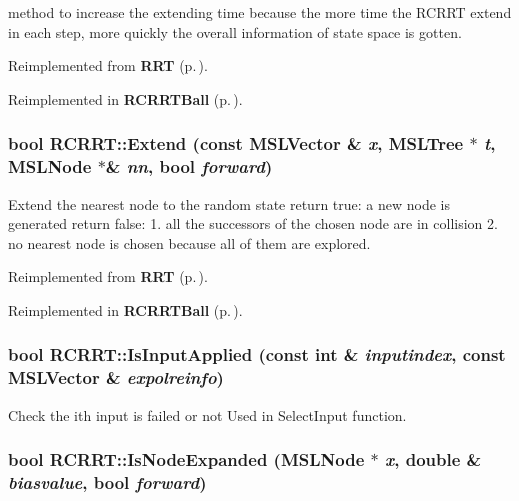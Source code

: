 method to increase the extending time because the more time the RCRRT extend in each step, more quickly the overall information of state space is gotten.



Reimplemented from {\bf RRT} {\rm (p.\,\pageref{classRRT_b3})}.

Reimplemented in {\bf RCRRTBall} {\rm (p.\,\pageref{classRCRRTBall_a4})}.
\subsubsection{\setlength{\rightskip}{0pt plus 5cm}bool RCRRT::Extend (const {\bf MSLVector} \& {\em x}, {\bf MSLTree} $\ast$ {\em t}, {\bf MSLNode} $\ast$\& {\em nn}, bool {\em forward})\hspace{0.3cm}{\tt  [virtual]}}\label{classRCRRT_a7}


Extend the nearest node to the random state return true: a new node is generated return false: 1. all the successors of the chosen node are in collision 2. no nearest node is chosen because all of them are explored.



Reimplemented from {\bf RRT} {\rm (p.\,\pageref{classRRT_b2})}.

Reimplemented in {\bf RCRRTBall} {\rm (p.\,\pageref{classRCRRTBall_a3})}.
\subsubsection{\setlength{\rightskip}{0pt plus 5cm}bool RCRRT::Is\-Input\-Applied (const int \& {\em inputindex}, const {\bf MSLVector} \& {\em expolreinfo})\hspace{0.3cm}{\tt  [virtual]}}\label{classRCRRT_a1}


Check the ith input is failed or not Used in Select\-Input function.

\subsubsection{\setlength{\rightskip}{0pt plus 5cm}bool RCRRT::Is\-Node\-Expanded ({\bf MSLNode} $\ast$ {\em x}, double \& {\em biasvalue}, bool {\em forward})}\label{classRCRRT_a0}


